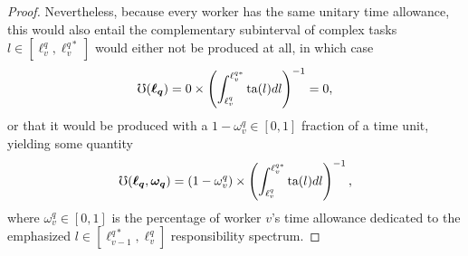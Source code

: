 \documentclass[hidelinks, nonatbib]{elsarticle}
\begin{document}
\begin{lemma}
\begin{proof}
        Nevertheless, because every worker has the same unitary time allowance, this would also entail the complementary subinterval of complex tasks $l \in [\ell_{v}^{q}, \ell_{v}^{q*}]$ would either not be produced at all, in which case
        \begin{align}
            \mho(\boldsymbol{\ell_{q}})
            =
            0
            \times
            \left(
                \int_{
                    \ell_{v}^{q}
                }^{
                    \ell_{v}^{q*}
                }
                \text{ta}(l)dl
            \right) ^ {-1}
            =
            0
            ,
        \end{align}
        or that it would be produced with a $1 - \omega_{v}^{q} \in [0,1]$ fraction of a time unit, yielding some quantity
        \begin{align}
            \mho(
                \boldsymbol{\ell_{q}}
                ,\boldsymbol{\omega_{q}}
            )
            =
            (1 - \omega_{v}^{q})
            \times
            \left(
                \int_{
                    \ell_{v}^{q}
                }^{
                    \ell_{v}^{q*}
                }
                \text{ta}(l)dl
            \right) ^ {-1}
            ,
        \end{align}
        where $\omega_{v}^{q} \in [0,1]$ is the percentage of worker $v$'s time allowance dedicated to the emphasized $l \in [\ell_{v-1}^{q*}, \ell_{v}^{q}]$ responsibility spectrum.
        

\end{proof}
\end{lemma}
\end{document}
